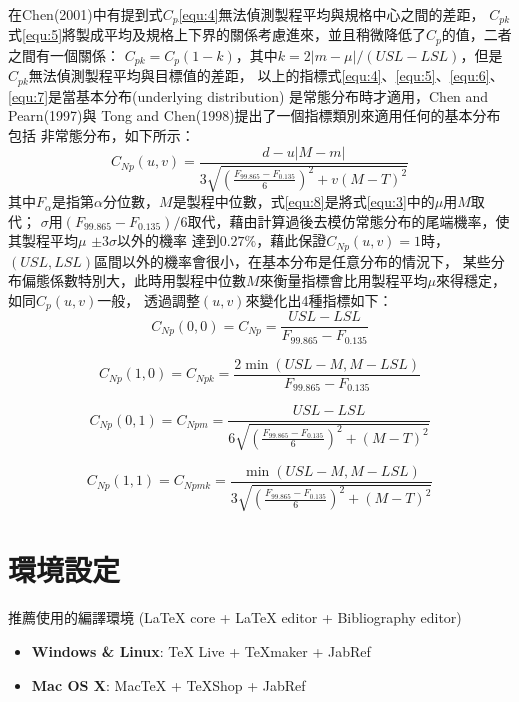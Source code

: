 在Chen(2001)\cite{Chen_2001}中有提到式$C_{p}$\ref{equ:4}無法偵測製程平均與規格中心之間的差距，
$C_{pk}$式\ref{equ:5}將製成平均及規格上下界的關係考慮進來，並且稍微降低了$C_{p}$的值，二者之間有一個關係：
$C_{pk}=C_{p}(1-k)$，其中$k=2|m-\mu|/(USL-LSL)$，但是$C_{pk}$無法偵測製程平均與目標值的差距，
以上的指標式\ref{equ:4}、\ref{equ:5}、\ref{equ:6}、\ref{equ:7}是當基本分布(underlying distribution)
是常態分布時才適用，Chen and Pearn(1997)\cite{ChenPearn_1997}與 Tong and Chen(1998)\cite{TongChen_1998}提出了一個指標類別來適用任何的基本分布包括
非常態分布，如下所示：
\begin{equation}\label{equ:8}
    C_{Np}(u, v)=\frac{d-u|M-m|}{3\sqrt{(\frac{F_{99.865}-F_{0.135}}{6})^{2}+v(M-T)^{2}}}
\end{equation}
其中$F_{\alpha}$是指第$\alpha$分位數，$M$是製程中位數，式\ref{equ:8}是將式\ref{equ:3}中的$\mu$用$M$取代；
$\sigma$用$(F_{99.865}-F_{0.135})/6$取代，藉由計算過後去模仿常態分布的尾端機率，使其製程平均$\mu$ $\pm 3\sigma$以外的機率
達到$0.27\%$，藉此保證$C_{Np}(u, v)=1$時，$(USL, LSL)$區間以外的機率會很小，在基本分布是任意分布的情況下，
某些分布偏態係數特別大，此時用製程中位數$M$來衡量指標會比用製程平均$\mu$來得穩定，如同$C_{p}(u,v)$一般，
透過調整$(u,v)$來變化出4種指標如下：
\begin{equation}\label{equ:9}
    C_{Np}(0, 0)= C_{Np}=\frac{USL-LSL}{F_{99.865}-F_{0.135}}
\end{equation}

\begin{equation}\label{equ:10}
    C_{Np}(1, 0)=C_{Npk}=\frac{2\min(USL-M, M-LSL)}{F_{99.865}-F_{0.135}}
\end{equation}

\begin{equation}\label{equ:11}
    C_{Np}(0, 1)=C_{Npm}=\frac{USL-LSL}{6\sqrt{(\frac{F_{99.865}-F_{0.135}}{6})^{2}+(M-T)^{2}}}
\end{equation}

\begin{equation}\label{equ:12}
    C_{Np}(1, 1)=C_{Npmk}=\frac{\min(USL-M, M-LSL)}{3\sqrt{(\frac{F_{99.865}-F_{0.135}}{6})^{2}+(M-T)^{2}}}
\end{equation}

\section{環境設定}

推薦使用的編譯環境 (LaTeX core + LaTeX editor + Bibliography editor)

\begin{itemize}
\item \textbf{Windows \& Linux}: TeX Live + TeXmaker + JabRef
\item \textbf{Mac OS X}: MacTeX + TeXShop + JabRef
\end{itemize}

